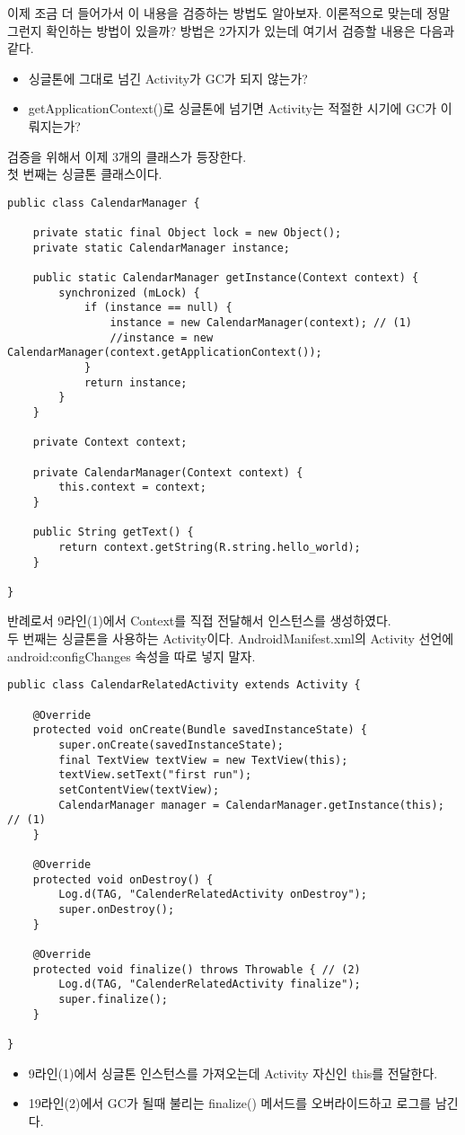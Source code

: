 
이제 조금 더 들어가서 이 내용을 검증하는 방법도 알아보자.
이론적으로 맞는데 정말 그런지 확인하는 방법이 있을까? 
방법은 2가지가 있는데 여기서 검증할 내용은 다음과 같다. 
\begin{itemize}
\item 싱글톤에 그대로 넘긴 Activity가 GC가 되지 않는가?
\item getApplicationContext()로 싱글톤에 넘기면 Activity는 적절한 시기에 GC가 이뤄지는가?
\end{itemize}

검증을 위해서 이제 3개의 클래스가 등장한다.\\ 

첫 번째는 싱글톤 클래스이다.
\begin{lstlisting}[frame=single]
public class CalendarManager {

	private static final Object lock = new Object();
	private static CalendarManager instance;
	
	public static CalendarManager getInstance(Context context) {
		synchronized (mLock) {
			if (instance == null) {
				instance = new CalendarManager(context); // (1)
				//instance = new CalendarManager(context.getApplicationContext());
			}
			return instance;
		}
	}
	
	private Context context;
	
	private CalendarManager(Context context) {
		this.context = context;
	}
	
	public String getText() {
		return context.getString(R.string.hello_world);
	}

}
\end{lstlisting}
반례로서 9라인(1)에서 Context를 직접 전달해서 인스턴스를 생성하였다.\\

두 번째는 싱글톤을 사용하는 Activity이다. AndroidManifest.xml의 Activity 선언에 android:config\-Changes 속성을 따로 넣지 말자.
\begin{lstlisting}[frame=single]
public class CalendarRelatedActivity extends Activity {

	@Override
	protected void onCreate(Bundle savedInstanceState) {
		super.onCreate(savedInstanceState);
		final TextView textView = new TextView(this);
		textView.setText("first run");
		setContentView(textView);
		CalendarManager manager = CalendarManager.getInstance(this); // (1)
	}

	@Override
	protected void onDestroy() {
		Log.d(TAG, "CalenderRelatedActivity onDestroy");
		super.onDestroy();
	}
	
	@Override
	protected void finalize() throws Throwable { // (2)
		Log.d(TAG, "CalenderRelatedActivity finalize");
		super.finalize();
	}
	
}
\end{lstlisting}
\begin{itemize}
\item 9라인(1)에서 싱글톤 인스턴스를 가져오는데 Activity 자신인 this를 전달한다.
\item 19라인(2)에서 GC가 될때 불리는 finalize() 메서드를 오버라이드하고 로그를 남긴다.
\end{itemize}

